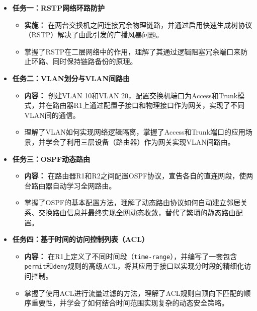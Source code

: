 \documentclass[12pt, a4paper]{article}
\begin{document}
\begin{itemize}
    \item \textbf{任务一：RSTP网络环路防护}
    \begin{itemize}
        \item \textbf{实施：} 在两台交换机之间连接冗余物理链路，并通过启用快速生成树协议（RSTP）解决了由此引发的广播风暴问题。
        \item 掌握了RSTP在二层网络中的作用，理解了其通过逻辑阻塞冗余端口来防止环路、同时保持链路备份的原理。
    \end{itemize}

    \item \textbf{任务二：VLAN划分与VLAN间路由}
    \begin{itemize}
        \item \textbf{内容：} 创建VLAN 10和VLAN 20，配置交换机端口为Access和Trunk模式，并在路由器R1上通过配置子接口和物理接口作为网关，实现了不同VLAN间的通信。
        \item 理解了VLAN如何实现网络逻辑隔离，掌握了Access和Trunk端口的应用场景，并学会了利用三层设备（路由器）作为网关实现VLAN间路由。
    \end{itemize}

    \item \textbf{任务三：OSPF动态路由}
    \begin{itemize}
        \item \textbf{内容：} 在路由器R1和R2之间配置OSPF协议，宣告各自的直连网段，使两台路由器自动学习全网路由。
        \item 掌握了OSPF的基本配置方法，理解了动态路由协议如何自动建立邻居关系、交换路由信息并最终实现全网动态收敛，替代了繁琐的静态路由配置。
    \end{itemize}

    \item \textbf{任务四：基于时间的访问控制列表（ACL）}
    \begin{itemize}
        \item \textbf{内容：} 在R1上定义了不同时间段（\texttt{time-range}），并编写了一套包含\texttt{permit}和\texttt{deny}规则的高级ACL，将其应用于接口以实现分时段的精细化访问控制。
        \item 掌握了使用ACL进行流量过滤的方法，理解了ACL规则自顶向下匹配的顺序重要性，并学会了如何结合时间范围实现复杂的动态安全策略。
    \end{itemize}


\end{itemize}
\end{document}
